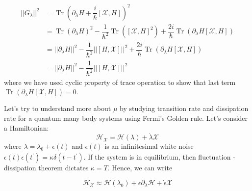 \documentclass[11pt,a4paper]{article}
\DeclareMathOperator{\Tr}{Tr}
\begin{document}
\begin{align}
||   G_{\lambda}||^2 &=\Tr (\partial_{\lambda} H + \dfrac{i}{\hbar} [\mathcal{X}, H])^2\\
&= \Tr (\partial_{\lambda} H)^2 -\dfrac{1}{\hbar^2}  \Tr ( [\mathcal{X}, H]^2) +\dfrac{2i}{\hbar} \Tr (\partial_{\lambda} H  [\mathcal{X}, H])\\
&= ||\partial_{\lambda} H||^2   - \dfrac{1}{\hbar^2} ||[H, \mathcal{X}]||^2 +\dfrac{2i}{\hbar} \Tr (\partial_{\lambda} H  [\mathcal{X}, H])\\
&= ||\partial_{\lambda} H||^2   - \dfrac{1}{\hbar^2} ||[H, \mathcal{X}]||^2 
\end{align}
where we have used cyclic property of trace operation to show that last term $ \Tr (\partial_{\lambda} H  [\mathcal{X}, H])=0$.

Let's try to understand more about $\mu$ by studying transition rate and dissipation rate for a quantum many body systems using Fermi's Golden rule. Let's consider a Hamiltonian:
\begin{equation}
\mathcal{H}_{\mathcal{X}} = \mathcal{H} (\lambda) + \dot{\lambda} \mathcal{X}
\end{equation}
where $\lambda= \lambda_0 + \epsilon(t)$ and $\epsilon(t)$ is an infinitesimal white noise $\overline{ \epsilon(t) \epsilon(t^{\prime})}= \kappa \delta(t -t^{\prime})$. If the system is in equilibrium, then fluctuation -dissipation theorem dictates $\kappa = T$. Hence, we can write

\begin{equation}
\mathcal{H}_{\mathcal{X}} \approx \mathcal{H} (\lambda_0)+ \epsilon \partial_{\lambda}\mathcal{H} + \dot{\epsilon} \mathcal{X}
\end{equation}
\end{document}
